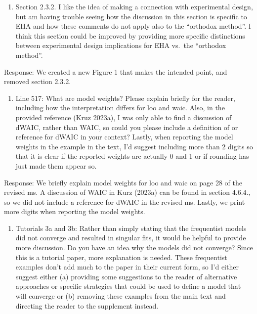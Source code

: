 \documentclass[
]{article}
\providecommand{\tightlist}{%
  \setlength{\itemsep}{0pt}\setlength{\parskip}{0pt}}
\renewenvironment{quote}{\begin{leftbar}}{\end{leftbar}}
\begin{document}
\begin{quote}
\begin{enumerate}
\def\labelenumi{\arabic{enumi}.}
\setcounter{enumi}{4}
\tightlist
\item
  Section 2.3.2. I like the idea of making a connection with
  experimental design, but am having trouble seeing how the discussion
  in this section is specific to EHA and how these comments do not apply
  also to the ``orthodox method''. I think this section could be
  improved by providing more specific distinctions between experimental
  design implications for EHA vs.~the ``orthodox method''.
\end{enumerate}
\end{quote}

Response: We created a new Figure 1 that makes the intended point, and
removed section 2.3.2.

\begin{quote}
\begin{enumerate}
\def\labelenumi{\arabic{enumi}.}
\setcounter{enumi}{5}
\tightlist
\item
  Line 517: What are model weights? Please explain briefly for the
  reader, including how the interpretation differs for loo and waic.
  Also, in the provided reference (Kruz 2023a), I was only able to find
  a discussion of dWAIC, rather than WAIC, so could you please include a
  definition of or reference for dWAIC in your context? Lastly, when
  reporting the model weights in the example in the text, I'd suggest
  including more than 2 digits so that it is clear if the reported
  weights are actually 0 and 1 or if rounding has just made them appear
  so.
\end{enumerate}
\end{quote}

Response: We briefly explain model weights for loo and waic on page 28
of the revised ms. A discussion of WAIC in Kurz (2023a) can be found in
section 4.6.4., so we did not include a reference for dWAIC in the
revised ms. Lastly, we print more digits when reporting the model
weights.

\begin{quote}
\begin{enumerate}
\def\labelenumi{\arabic{enumi}.}
\setcounter{enumi}{6}
\tightlist
\item
  Tutorials 3a and 3b: Rather than simply stating that the frequentist
  models did not converge and resulted in singular fits, it would be
  helpful to provide more discussion. Do you have an idea why the models
  did not converge? Since this is a tutorial paper, more explanation is
  needed. These frequentist examples don't add much to the paper in
  their current form, so I'd either suggest either (a) providing some
  suggestions to the reader of alternative approaches or specific
  strategies that could be used to define a model that will converge or
  (b) removing these examples from the main text and directing the
  reader to the supplement instead.
\end{enumerate}
\end{quote}
\end{document}
